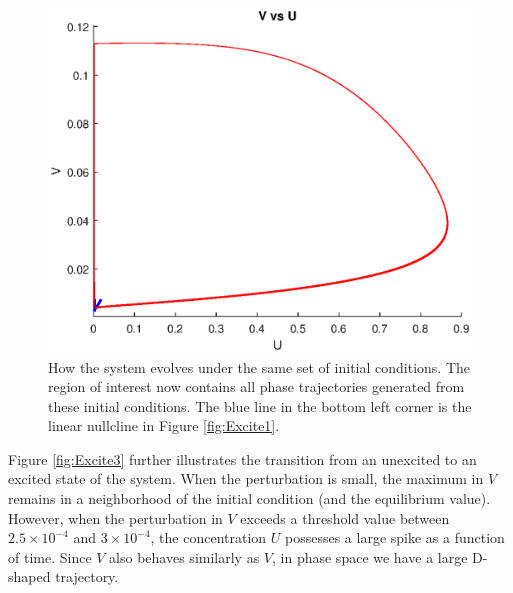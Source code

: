 \documentclass[twocolumn,amsmath,amssymb,aps]{revtex4}
\begin{document}
\begin{figure}[!htb]
	\centering
	\includegraphics[scale=0.5]{excite_22.eps}
	\caption{How the system evolves under the same set of initial conditions. The region of interest now contains all phase trajectories generated from these initial conditions. The blue line in the bottom left corner is the linear nullcline in Figure \ref{fig:Excite1}.}
	\label{fig:Excite2}
\end{figure}

Figure \ref{fig:Excite3} further illustrates the transition from an unexcited to an excited state of the system. When the perturbation is small, the maximum in $V$ remains in a neighborhood of the initial condition (and the equilibrium value). However, when the perturbation in $V$ exceeds a threshold value between $2.5 \times 10^{-4}$ and $3 \times 10^{-4}$, the concentration $U$ possesses a large spike as a function of time. Since $V$ also behaves similarly as $V$, in phase space we have a large D-shaped trajectory.
\end{document}
